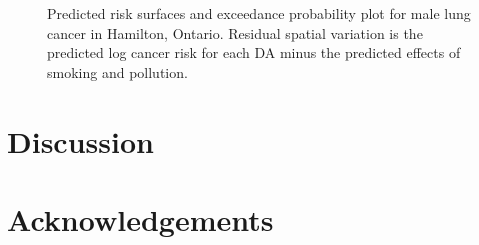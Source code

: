 \documentclass[12pt]{article}
\begin{document}
\begin{figure}[H]
\caption{Predicted risk surfaces and exceedance probability plot for male lung cancer in Hamilton, Ontario.  Residual spatial variation is the predicted log cancer risk for each DA minus the predicted effects of smoking and pollution.}
\label{fig:female}
\end{figure}


\section{Discussion}


\section*{Acknowledgements}


\end{document}
